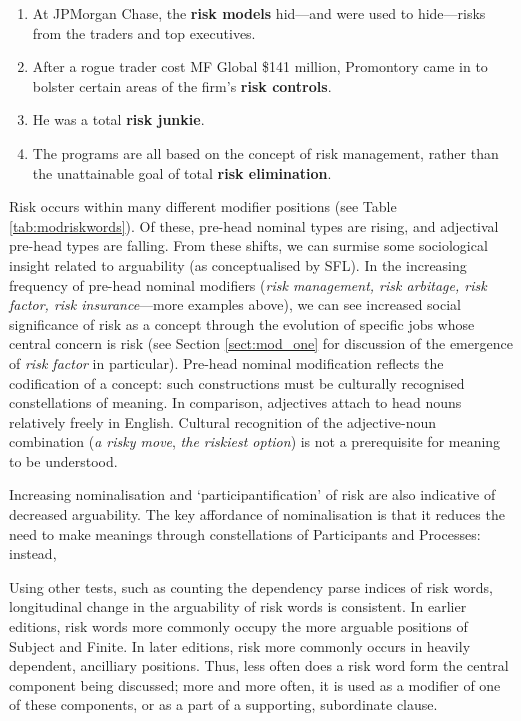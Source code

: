 \begin{enumerate}  [before=\itshape,font=\normalfont] \setlength\itemsep{0em} \small
\item At JPMorgan Chase, the \textbf{risk models} hid---and were used to hide---risks from the traders and top executives.
\item After a rogue trader cost MF Global \$141 million, Promontory came in to bolster certain areas of the firm's \textbf{risk controls}.
\item He was a total \textbf{risk junkie}.
\item The programs are all based on the concept of risk management, rather than the unattainable goal of total \textbf{risk elimination}.
\end{enumerate}
%
Risk occurs within many different modifier positions (see Table \ref{tab:modriskwords}). Of these, pre-head nominal types are rising, and adjectival pre-head types are falling. From these shifts, we can surmise some sociological insight related to arguability (as conceptualised by SFL). In the increasing frequency of pre-head nominal modifiers (\emph{risk management, risk arbitage, risk factor, risk insurance}---more examples above), we can see increased social significance of risk as a concept through the evolution of specific jobs whose central concern is risk (see Section \ref{sect:mod_one} for discussion of the emergence of \emph{risk factor} in particular). Pre-head nominal modification reflects the codification of a concept: such constructions must be culturally recognised constellations of meaning. In comparison, adjectives attach to head nouns relatively freely in English. Cultural recognition of the adjective-noun combination (\emph{a risky move}, \emph{the riskiest option}) is not a prerequisite for meaning to be understood.

Increasing nominalisation and `participantification' of risk are also indicative of decreased arguability. The key affordance of nominalisation is that it reduces the need to make meanings through constellations of Participants and Processes: instead,

Using other tests, such as counting the dependency parse indices of risk words, longitudinal change in the arguability of risk words is consistent. In earlier editions, risk words more commonly occupy the more arguable positions of Subject and Finite. In later editions, risk more commonly occurs in heavily dependent, ancilliary positions. Thus, less often does a risk word form the central component being discussed; more and more often, it is used as a modifier of one of these components, or as a part of a supporting, subordinate clause.

